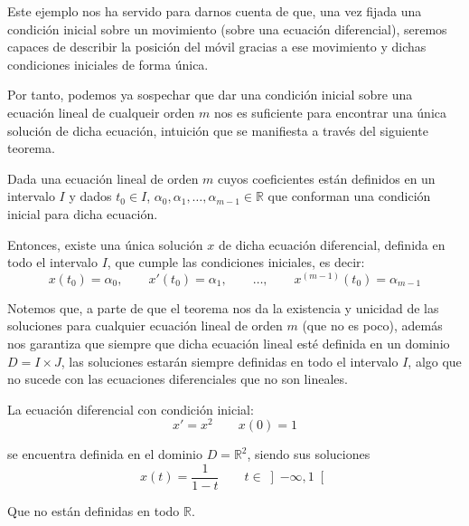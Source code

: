 Este ejemplo nos ha servido para darnos cuenta de que, una vez fijada una condición inicial sobre un movimiento (sobre una ecuación diferencial), seremos capaces de describir la posición del móvil gracias a ese movimiento y dichas condiciones iniciales de forma única.

Por tanto, podemos ya sospechar que dar una condición inicial sobre una ecuación lineal de cualqueir orden $m$ nos es suficiente para encontrar una única solución de dicha ecuación, intuición que se manifiesta a través del siguiente teorema.

\begin{teo}\label{teo:existencia_unicidad}
    Dada una ecuación lineal de orden $m$ cuyos coeficientes están definidos en un intervalo $I$ y dados $t_0\in I$, $\alpha_0,\alpha_1,\ldots,\alpha_{m-1}\in \mathbb{R}$ que conforman una condición inicial para dicha ecuación.

    Entonces, existe una única solución $x$ de dicha ecuación diferencial, definida en todo el intervalo $I$, que cumple las condiciones iniciales, es decir:
    \begin{equation*}
        x(t_0) = \alpha_0, \qquad x'(t_0) = \alpha_1,\qquad  \ldots, \qquad  x^{(m-1)}(t_0) = \alpha_{m-1}
    \end{equation*}

\end{teo}

Notemos que, a parte de que el teorema nos da la existencia y unicidad de las soluciones para cualquier ecuación lineal de orden $m$ (que no es poco), además nos garantiza que siempre que dicha ecuación lineal esté definida en un dominio $D=I\times J$, las soluciones estarán siempre definidas en todo el intervalo $I$, algo que no sucede con las ecuaciones diferenciales que no son lineales.

\begin{ejemplo}
    La ecuación diferencial con condición inicial:
    \begin{equation*}
        x' = x^2 \qquad x(0) = 1
    \end{equation*}

    se encuentra definida en el dominio $D=\mathbb{R}^2$, siendo sus soluciones
    \begin{equation*}
        x(t) = \dfrac{1}{1-t} \qquad t\in \left]-\infty,1\right[
    \end{equation*}

    Que no están definidas en todo $\mathbb{R}$.
\end{ejemplo}

